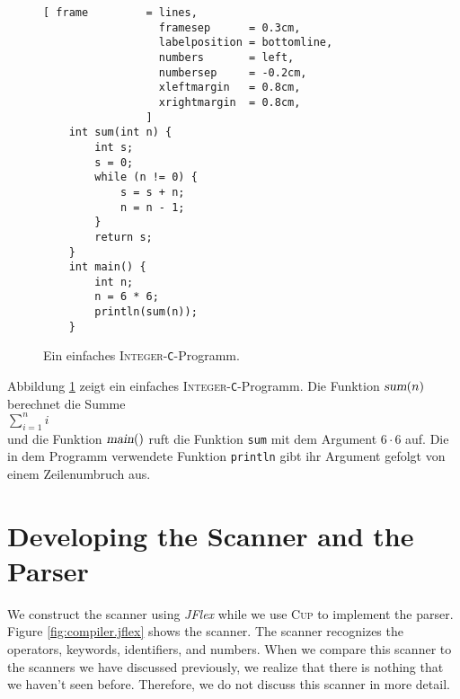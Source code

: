 \begin{figure}[!ht]
\centering
\begin{Verbatim}[ frame         = lines, 
                  framesep      = 0.3cm, 
                  labelposition = bottomline,
                  numbers       = left,
                  numbersep     = -0.2cm,
                  xleftmargin   = 0.8cm,
                  xrightmargin  = 0.8cm,
                ]
    int sum(int n) {
        int s;
        s = 0;
        while (n != 0) {
            s = s + n;
            n = n - 1;    
        }
        return s;
    }  
    int main() {
        int n;
        n = 6 * 6;
        println(sum(n));
    }
\end{Verbatim}
\vspace*{-0.3cm}
\caption{Ein einfaches \textsc{Integer}-\texttt{C}-Programm.}
\label{fig:sum.c}
\end{figure}

\noindent
Abbildung \ref{fig:sum.c} zeigt ein einfaches \textsc{Integer}-\texttt{C}-Programm.  Die Funktion
$\textsl{sum}(n)$ berechnet die Summe
\\[0.2cm]
\hspace*{1.3cm}
 $\sum\limits_{i=1}^n i$
\\[0.2cm]
und die Funktion $\textsl{main}()$ ruft die Funktion \texttt{sum} mit dem Argument $6 \cdot 6$ auf.
Die in dem Programm verwendete Funktion \texttt{println} gibt ihr Argument gefolgt von einem
Zeilenumbruch aus.
\pagebreak

\section{Developing the  Scanner and the Parser}
We construct the scanner using  \textsl{JFlex} while we use \textsc{Cup} to implement the parser.
Figure \ref{fig:compiler.jflex} shows the scanner.  The scanner recognizes the operators, keywords,
identifiers, and numbers.  When we compare this scanner to the scanners we have discussed
previously, we realize that there is nothing that we haven't seen before.  Therefore, we do not
discuss this scanner in more detail.


